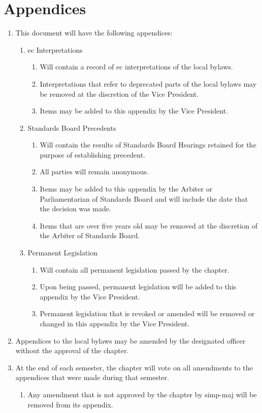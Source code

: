\section{Appendices}
	\label{appendices}
	\begin{enumerate}
		\item This document will have the following appendices:
			\begin{enumerate}
				\item \gls{ec} Interpretations
					\begin{enumerate}
						\item Will contain a record of \gls{ec} interpretations of the local bylaws.
						\item Interpretations that refer to deprecated parts of the local bylaws may be removed at the discretion of the Vice President.
						\item Items may be added to this appendix by the Vice President.
					\end{enumerate}
				\item Standards Board Precedents
					\begin{enumerate}
						\item Will contain the results of Standards Board Hearings retained for the purpose of establishing precedent.
						\item All parties will remain anonymous.
						\item Items may be added to this appendix by the Arbiter or Parliamentarian of Standards Board and will include the date that the decision was made.
						\item Items that are over five years old may be removed at the discretion of the Arbiter of Standards Board.
					\end{enumerate}
				\item Permanent Legislation
					\begin{enumerate}
						\item Will contain all permanent legislation passed by the chapter.
						\item Upon being passed, permanent legislation will be added to this appendix by the Vice President.
						\item Permanent legislation that is revoked or amended will be removed or changed in this appendix by the Vice President.
					\end{enumerate}
			\end{enumerate}
        \item Appendices to the local bylaws may be amended by the designated officer without the approval of the chapter.
		\item At the end of each semester, the chapter will vote on all amendments to the appendices that were made during that semester.
			\begin{enumerate}
				\item Any amendment that is not approved by the chapter by \gls{simp-maj} will be removed from its appendix.
			\end{enumerate}
	\end{enumerate}

